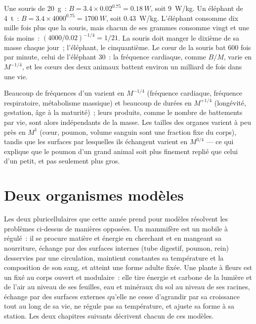 \begin{example}\label{ex:b1:organism-environment:mouseelephant}
Une souris de \qty{20}{g}~: $B = 3.4\times 0.02^{0.75} = \qty{0.18}{W}$,
soit \qty{9}{W/kg}. Un éléphant de \qty{4}{t}~: $B = 3.4\times 4000^{0.75} =
\qty{1700}{W}$, soit \qty{0.43}{W/kg}. L'éléphant consomme dix mille
fois plus que la souris, mais chacun de ses grammes consomme vingt et
une fois moins~: $(4000/0.02)^{-1/4} = 1/21$. La souris doit manger le
dixième de sa masse chaque jour~; l'éléphant, le cinquantième. Le cœur
de la souris bat \qty{600}{} fois par minute, celui de l'éléphant
\qty{30}{}~: la fréquence cardiaque, comme $B/M$, varie en $M^{-1/4}$,
et les cœurs des deux animaux battent environ un milliard de fois dans
une vie.
\end{example}

\begin{remark}\label{rem:b1:organism-environment:consequences}
Beaucoup de fréquences d'un  varient en $M^{-1/4}$ (fréquence
cardiaque, fréquence respiratoire, métabolisme massique) et beaucoup de
durées en $M^{+1/4}$ (longévité, gestation, âge à la maturité)~; leurs
produits, comme le nombre de battements par vie, sont alors indépendants
de la masse. Les tailles des organes varient à peu près en $M^{1}$
(cœur, poumon, volume sanguin sont une fraction fixe du corps), tandis
que les surfaces par lesquelles ils échangent varient en $M^{3/4}$ ---
ce qui explique que le poumon d'un grand animal soit plus finement
replié que celui d'un petit, et pas seulement plus gros.
\end{remark}

\section{Deux organismes modèles}

\begin{proposition}\label{prop:b1:organism-environment:models}
Les deux  pluricellulaires que cette année prend pour modèles
résolvent les problèmes ci-dessus de manières opposées. Un mammifère est
un  mobile à  régulé~: il se procure matière
et énergie en cherchant et en mangeant sa nourriture, échange par des
surfaces internes (tube digestif, poumon, rein) desservies par une
circulation, maintient constantes sa température et la composition de
son sang, et atteint une forme adulte fixée. Une plante à fleurs est un
 fixé au corps ouvert et modulaire~: elle tire énergie et
carbone de la lumière et de l'air au niveau de ses feuilles, eau et
minéraux du sol au niveau de ses racines, échange par des surfaces
externes qu'elle ne cesse d'agrandir par sa croissance tout au long de
sa vie, ne régule pas sa température, et ajuste sa forme à sa station.
Les deux chapitres suivants décrivent chacun de ces modèles.
\end{proposition}

